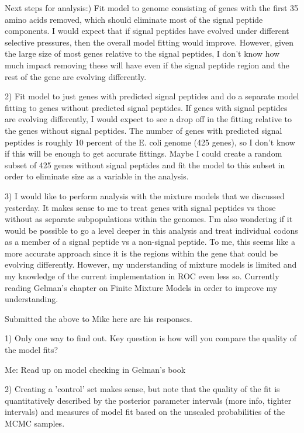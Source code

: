 \documentclass[11pt]{labbook}
\begin{document}
Next steps for analysis:) Fit model to genome consisting of genes with the first 35 amino acids removed, which should eliminate most of the signal peptide components. I would expect that if signal peptides have evolved under different selective pressures, then the overall model fitting would improve. However, given the large size of most genes relative to the signal peptides, I don't know how much impact removing these will have even if the signal peptide region and the rest of the gene are evolving differently. 

2) Fit model to just genes with predicted signal peptides and do a separate model fitting to genes without predicted signal peptides. If genes with signal peptides are evolving differently, I would expect to see a drop off in the fitting relative to the genes without signal peptides. The number of genes with predicted signal peptides is roughly 10 percent of the E. coli genome (425 genes), so I don't know if this will be enough to get accurate fittings. Maybe I could create a random subset of 425 genes without signal peptides and fit the model to this subset in order to eliminate size as a variable in the analysis.

3) I would like to perform analysis with the mixture models that we discussed yesterday. It makes sense to me to treat genes with signal peptides vs those without as separate subpopulations within the genomes. I'm also wondering if it would be possible to go a level deeper in this analysis and treat individual codons as a member of a signal peptide vs a non-signal peptide. To me, this seems like a more accurate approach since it is the regions within the gene that could be evolving differently. However, my understanding of mixture models is limited and my knowledge of the current implementation in ROC even less so. Currently reading Gelman's chapter on Finite Mixture Models in order to improve my understanding. 

Submitted the above to Mike here are his responses.

1) Only one way to find out.  Key question is how will you compare the quality of the model fits? 

Me: Read up on model checking in Gelman's book

2) Creating a 'control' set makes sense, but note that the quality of the fit is quantitatively described by the  posterior parameter intervals (more info, tighter intervals) and measures of model fit based on the unscaled probabilities of the MCMC samples.
\end{document}

